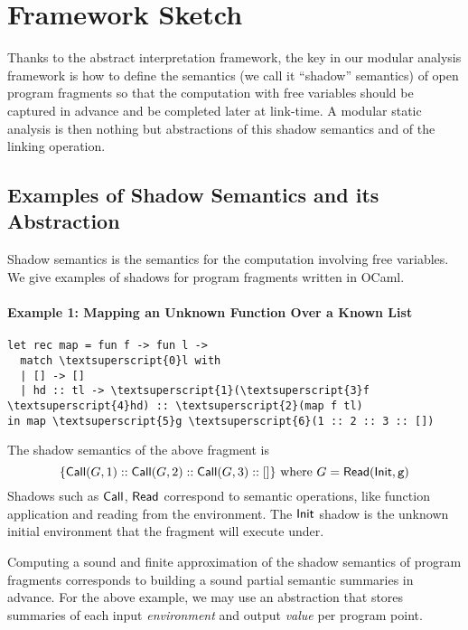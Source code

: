 \documentclass{article}
\begin{document}
\section{Framework Sketch}
Thanks to the abstract interpretation framework, the key in our
modular analysis framework is how to define the semantics (we call it
``shadow'' semantics) of open program fragments so that the
computation with free variables should be captured in advance
and be completed later at link-time. A modular static analysis is
then nothing but abstractions of this shadow semantics and of the
linking operation.

\subsection{Examples of Shadow Semantics and its Abstraction}
Shadow semantics is the semantics for the computation involving
free variables. We give examples of shadows for program fragments
written in OCaml.

\paragraph{Example 1: Mapping an Unknown Function Over a Known List}
\begin{center}
  \begin{BVerbatim}[commandchars=\\\{\}]
let rec map = fun f -> fun l ->
  match \textsuperscript{0}l with
  | [] -> []
  | hd :: tl -> \textsuperscript{1}(\textsuperscript{3}f \textsuperscript{4}hd) :: \textsuperscript{2}(map f tl)
in map \textsuperscript{5}g \textsuperscript{6}(1 :: 2 :: 3 :: [])
  \end{BVerbatim}
\end{center}
The shadow semantics of the above fragment is
\[
  \{\mathsf{Call}({G},1)::\mathsf{Call}({G},2)::\mathsf{Call}({G},3)::[]\}
  \text{ where }
  {G}=\mathsf{Read}(\mathsf{Init},\texttt{g})
\]
Shadows such as $\mathsf{Call}$, $\mathsf{Read}$ correspond to semantic operations,
like function application and reading from the environment.
The $\mathsf{Init}$ shadow is the unknown initial environment that the fragment will execute under.

Computing a sound and finite approximation of the shadow
semantics of program fragments corresponds to building a sound partial
semantic summaries in advance. For the above example,
we may use an abstraction that stores summaries of each input \emph{environment}
and output \emph{value} per program point.
\end{document}
